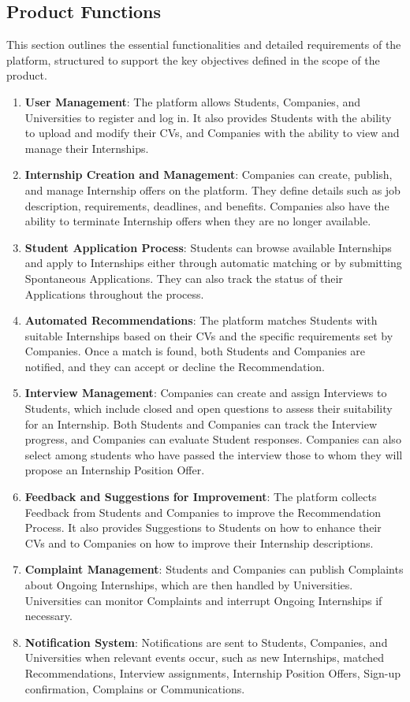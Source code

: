 \subsection{Product Functions}
This section outlines the essential functionalities and detailed requirements of the platform, structured to support the key objectives defined in the scope of the product.
\begin{enumerate}
    \item \textbf{\color{titleColor}User Management}: The platform allows Students, Companies, and Universities to register and log in. It also provides Students with the ability to upload and modify their CVs, and Companies with the ability to view and manage their Internships.
    \item \textbf{\color{titleColor}Internship Creation and Management}: Companies can create, publish, and manage Internship offers on the platform. They define details such as job description, requirements, deadlines, and benefits. Companies also have the ability to terminate Internship offers when they are no longer available.
    \item \textbf{\color{titleColor}Student Application Process}: Students can browse available Internships and apply to Internships either through automatic matching or by submitting Spontaneous Applications. They can also track the status of their Applications throughout the process.
    \item \textbf{\color{titleColor}Automated Recommendations}: The platform matches Students with suitable Internships based on their CVs and the specific requirements set by Companies. Once a match is found, both Students and Companies are notified, and they can accept or decline the Recommendation.
    \item \textbf{\color{titleColor}Interview Management}: Companies can create and assign Interviews to Students, which include closed and open questions to assess their suitability for an Internship. Both Students and Companies can track the Interview progress, and Companies can evaluate Student responses. Companies can also select among students who have passed the interview those to whom they will propose an Internship Position Offer.
    \item \textbf{\color{titleColor}Feedback and Suggestions for Improvement}: The platform collects Feedback from Students and Companies to improve the Recommendation Process. It also provides Suggestions to Students on how to enhance their CVs and to Companies on how to improve their Internship descriptions.
    \item \textbf{\color{titleColor}Complaint Management}: Students and Companies can publish Complaints about Ongoing Internships, which are then handled by Universities. Universities can monitor Complaints and interrupt Ongoing Internships if necessary.
    \item \textbf{\color{titleColor}Notification System}: Notifications are sent to Students, Companies, and Universities when relevant events occur, such as new Internships, matched Recommendations, Interview assignments,  Internship Position Offers, Sign-up confirmation, Complains or Communications.
\end{enumerate}

